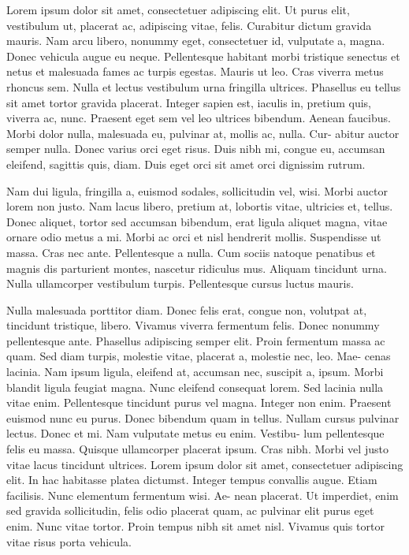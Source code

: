 \documentclass{book}
\begin{document}
\frontmatter
Lorem ipsum dolor sit amet, consectetuer adipiscing elit. Ut purus elit,
vestibulum ut, placerat ac, adipiscing vitae, felis. Curabitur dictum gravida
mauris. Nam arcu libero, nonummy eget, consectetuer id, vulputate a, magna.
Donec vehicula augue eu neque. Pellentesque habitant morbi tristique senectus
et netus et malesuada fames ac turpis egestas. Mauris ut leo. Cras viverra
metus rhoncus sem. Nulla et lectus vestibulum urna fringilla ultrices. Phasellus
eu tellus sit amet tortor gravida placerat. Integer sapien est, iaculis in, pretium
quis, viverra ac, nunc. Praesent eget sem vel leo ultrices bibendum. Aenean
faucibus. Morbi dolor nulla, malesuada eu, pulvinar at, mollis ac, nulla. Cur-
abitur auctor semper nulla. Donec varius orci eget risus. Duis nibh mi, congue
eu, accumsan eleifend, sagittis quis, diam. Duis eget orci sit amet orci dignissim
rutrum.

Nam dui ligula, fringilla a, euismod sodales, sollicitudin vel, wisi. Morbi
auctor lorem non justo. Nam lacus libero, pretium at, lobortis vitae, ultricies et,
tellus. Donec aliquet, tortor sed accumsan bibendum, erat ligula aliquet magna,
vitae ornare odio metus a mi. Morbi ac orci et nisl hendrerit mollis. Suspendisse
ut massa. Cras nec ante. Pellentesque a nulla. Cum sociis natoque penatibus et
magnis dis parturient montes, nascetur ridiculus mus. Aliquam tincidunt urna.
Nulla ullamcorper vestibulum turpis. Pellentesque cursus luctus mauris.

Nulla malesuada porttitor diam. Donec felis erat, congue non, volutpat at,
tincidunt tristique, libero. Vivamus viverra fermentum felis. Donec nonummy
pellentesque ante. Phasellus adipiscing semper elit. Proin fermentum massa
ac quam. Sed diam turpis, molestie vitae, placerat a, molestie nec, leo. Mae-
cenas lacinia. Nam ipsum ligula, eleifend at, accumsan nec, suscipit a, ipsum.
Morbi blandit ligula feugiat magna. Nunc eleifend consequat lorem. Sed lacinia
nulla vitae enim. Pellentesque tincidunt purus vel magna. Integer non enim.
Praesent euismod nunc eu purus. Donec bibendum quam in tellus. Nullam
cursus pulvinar lectus. Donec et mi. Nam vulputate metus eu enim. Vestibu-
lum pellentesque felis eu massa.
Quisque ullamcorper placerat ipsum. Cras
nibh. Morbi vel justo vitae lacus tincidunt ultrices. Lorem ipsum dolor sit
amet, consectetuer adipiscing elit. In hac habitasse platea dictumst. Integer
tempus convallis augue. Etiam facilisis. Nunc elementum fermentum wisi. Ae-
nean placerat. Ut imperdiet, enim sed gravida sollicitudin, felis odio placerat
quam, ac pulvinar elit purus eget enim. Nunc vitae tortor. Proin tempus nibh
sit amet nisl. Vivamus quis tortor vitae risus porta vehicula.
\end{document}
